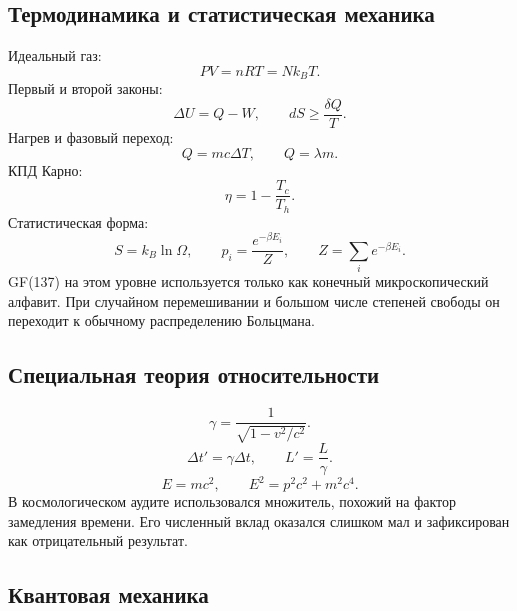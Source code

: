 \documentclass[11pt]{article}
\begin{document}
\subsection{Термодинамика и статистическая механика}

Идеальный газ:
\begin{equation}
    PV=nRT=Nk_BT.
\end{equation}
Первый и второй законы:
\begin{equation}
    \Delta U=Q-W,\qquad
    dS\ge \frac{\delta Q}{T}.
\end{equation}
Нагрев и фазовый переход:
\begin{equation}
    Q=mc\Delta T,\qquad
    Q=\lambda m.
\end{equation}
КПД Карно:
\begin{equation}
    \eta=1-\frac{T_c}{T_h}.
\end{equation}
Статистическая форма:
\begin{equation}
    S=k_B\ln\Omega,\qquad
    p_i=\frac{e^{-\beta E_i}}{Z},\qquad
    Z=\sum_i e^{-\beta E_i}.
\end{equation}
GF(137) на этом уровне используется только как конечный микроскопический
алфавит.  При случайном перемешивании и большом числе степеней свободы он
переходит к обычному распределению Больцмана.

\subsection{Специальная теория относительности}

\begin{equation}
    \gamma=\frac{1}{\sqrt{1-v^2/c^2}}.
\end{equation}
\begin{equation}
    \Delta t'=\gamma\Delta t,\qquad
    L'=\frac{L}{\gamma}.
\end{equation}
\begin{equation}
    E=mc^2,\qquad
    E^2=p^2c^2+m^2c^4.
\end{equation}
В космологическом аудите использовался множитель, похожий на фактор замедления
времени.  Его численный вклад оказался слишком мал и зафиксирован как
отрицательный результат.

\subsection{Квантовая механика}
\end{document}
